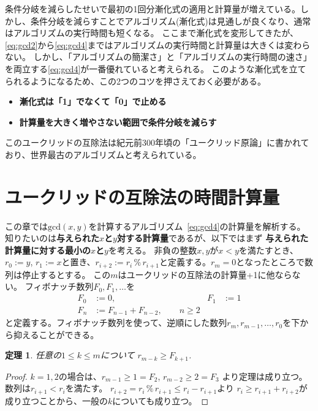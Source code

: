 \documentclass[a4paper,oneside,onecolumn,openany,article,10pt]{memoir}
\newtheorem{theorem}{定理}
\theoremstyle{remark}
\begin{document}
条件分岐を減らしたせいで最初の1回分漸化式の適用と計算量が増えている。しかし、条件分岐を減らすことでアルゴリズム(漸化式)は見通しが良くなり、通常はアルゴリズムの実行時間も短くなる。
ここまで漸化式を変形してきたが、\eqref{eq:gcd2}から\eqref{eq:gcd4}まではアルゴリズムの実行時間と計算量は大きくは変わらない。
しかし、「アルゴリズムの簡潔さ」と「アルゴリズムの実行時間の速さ」を両立する\eqref{eq:gcd4}が一番優れていると考えられる。
このような漸化式を立てられるようになるため、この2つのコツを押さえておく必要がある。
\begin{itemize}
\item \textbf{漸化式は「1」でなくて「0」で止める}
\item \textbf{計算量を大きく増やさない範囲で条件分岐を減らす}
\end{itemize}
このユークリッドの互除法は紀元前300年頃の「ユークリッド原論」に書かれており、世界最古のアルゴリズムと考えられている。

\section{ユークリッドの互除法の時間計算量}\label{sec:ceuclidean}
この章では$\mathrm{gcd}(x,y)$を計算するアルゴリズム~\eqref{eq:gcd4}の計算量を解析する。
知りたいのは\textbf{与えられた$x$と$y$対する計算量}であるが、以下ではまず
\textbf{与えられた計算量に対する最小の$x$と$y$}を考える。
非負の整数$x,y$が$x<y$を満たすとき、$r_0:=y$, $r_1:=x$と置き、$r_{i+2} := r_{i}\,\%\,r_{i+1}$と定義する。$r_m=0$となったところで数列は停止するとする。
この$m$はユークリッドの互除法の計算量+1に他ならない。
フィボナッチ数列$F_0,F_1,\dotsc$を
\begin{align*}
F_0 &:= 0,& F_1 &:= 1\\
F_n &:= F_{n-1} + F_{n-2}, \qquad n\ge 2
\end{align*}
と定義する。フィボナッチ数列を使って、逆順にした数列$r_m, r_{m-1}, \dotsc, r_0$を下から抑えることができる。

\begin{theorem}
任意の$1\le k \le m$について
$r_{m-k}\ge F_{k+1}$.
\end{theorem}
\begin{proof}
$k=1,2$の場合は、$r_{m-1}\ge 1 = F_2$, $r_{m-2} \ge 2 = F_3$ より定理は成り立つ。
数列は$r_{i+1}<r_i$を満たす。
$r_{i+2} = r_i\,\%\,r_{i+1} \le r_i - r_{i+1}$より $r_i \ge r_{i+1} + r_{i+2}$が成り立つことから、一般の$k$についても成り立つ。
\end{proof}
\end{document}

